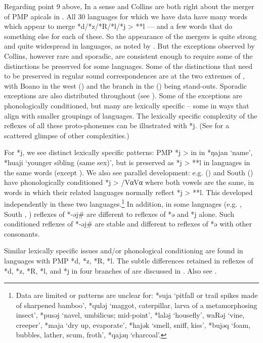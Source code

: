Regarding point 9 above,
In a sense \citeauthor{Stresemann1927}
and Collins are both right about the merger of PMP apicals in .
All 30  languages for which we have data have
many words which appear to merge *d/*z/*R/*l/*j > **l ---
and a few words that do something else for each of these.
So the appearance of the mergers is quite strong
and quite widespread in  languages,
as noted by \citeauthor{Stresemann1927}.
But the exceptions observed by Collins,
however rare and sporadic, are consistent enough to require some
of the distinctions be preserved for some languages.
Some of the distinctions that need to be preserved in regular
sound correspondences are at the two extremes of ,
with Boano in the west ()
and the  branch in the  () being stand-outs.
Sporadic exceptions are also distributed throughout
 (see  ).
Some of the exceptions are phonologically conditioned,
but many are lexically specific -- some in ways that align with
smaller groupings of languages.
The lexically specific complexity of the reflexes of all these
proto-phonemes can be illustrated with *j.
(See \citet{Collins1983} for a scattered glimpse of other complexities.)

For *j, we see distinct lexically specific patterns: PMP *j >
{\0} in  in *ŋajan ‘name’,
*huaji ‘younger sibling (same sex)’,
but is preserved as *j > **l in  languages in
the same words (except ).
We also see parallel development: e.g.
 () and South  ()
have phonologically conditioned *j > {\0} /Vα{\gap}Vα where both
vowels are the same,
in words in which their related languages normally reflect *j > **l.
This developed independently in these two languages.\footnote{
		Data are limited or patterns are unclear %
		for: *suja ‘pitfall or trail spikes made of sharpened bamboo’,
		*quləj ‘maggot, caterpillar, larva of a metamorphosing insect’,
		*pusəj ‘navel, umbilicus; mid-point’,
		*laləj ‘housefly’, waRəj ‘vine,
		creeper’, *maja ‘dry up, evaporate’,
		*hajək ‘smell, sniff, kiss’, *bujəq ‘foam, bubbles,
		lather, scum, froth’, *qajəŋ ‘charcoal’.}
In addition,
in some languages (e.g.
, South , ) reflexes of *-əj{\#}
are different to reflexes of *ə and *j alone.
Such conditioned reflexes of *-əj{\#} are stable
and different to reflexes of *ə with other consonants.

Similar lexically specific issues and/or phonological conditioning
are found in  languages with PMP *d, *z, *R, *l.
The subtle differences retained in reflexes of *d,
*z, *R, *l, and *j in four branches of  are
discussed in . Also see \citet{Collins1983}.